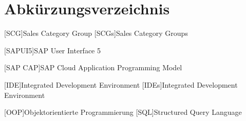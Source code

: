 \chapter*{Abkürzungsverzeichnis}
\begin{acronym}
    [SCG]{Sales Category Group} 
    [SCGs]{Sales Category Groups}
\end{acronym}

\begin{acronym}
    [SAPUI5]{SAP User Interface 5}
\end{acronym}

\begin{acronym}
    [SAP CAP]{SAP Cloud Application Programming Model}
\end{acronym}

\begin{acronym}
    [IDE]{Integrated Development Environment}
    [IDEs]{Integrated Development Environment}
\end{acronym}

\begin{acronym}
    [OOP]{Objektorientierte Programmierung}
    [SQL]{Structured Query Language}
\end{acronym}
